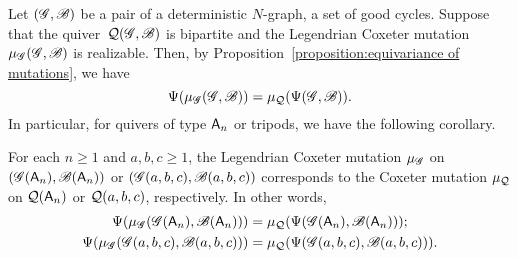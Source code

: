 Let $(\mathscr{G}, \mathscr{B})$ be a pair of a deterministic $N$-graph, a set of good cycles.
Suppose that the quiver~$\mathcal{Q}(\mathscr{G},\mathscr{B})$ is bipartite and the Legendrian Coxeter mutation $\mu_\mathscr{G}(\mathscr{G},\mathscr{B})$ is realizable.
Then, by Proposition~\ref{proposition:equivariance of mutations}, we have
\[
\Psi(\mu_\mathscr{G}(\mathscr{G},\mathscr{B})) = \mu_{\mathcal{Q}}(\Psi(\mathscr{G},\mathscr{B})).
\]
In particular, for quivers of type $\mathsf{A}_n$ or tripods, we have the following corollary.
\begin{corollary}\label{corollary:Coxeter mutations}
For each $n\ge 1$ and $a,b,c\ge 1$, the Legendrian Coxeter mutation $\mu_\mathscr{G}$ on $(\mathscr{G}(\mathsf{A}_n),\mathscr{B}(\mathsf{A}_n))$ or $(\mathscr{G}(a,b,c),\mathscr{B}(a,b,c))$ corresponds to the Coxeter mutation $\mu_{\mathcal{Q}}$ on $\mathcal{Q}(\mathsf{A}_n)$ or $\mathcal{Q}(a,b,c)$, respectively.
In other words,
\begin{align*}
\Psi(\mu_\mathscr{G}(\mathscr{G}(\mathsf{A}_n),\mathscr{B}(\mathsf{A}_n))) &= \mu_{\mathcal{Q}}(\Psi(\mathscr{G}(\mathsf{A}_n),\mathscr{B}(\mathsf{A}_n)));\\
\Psi(\mu_\mathscr{G}(\mathscr{G}(a,b,c),\mathscr{B}(a,b,c))) &= \mu_{\mathcal{Q}}(\Psi(\mathscr{G}(a,b,c),\mathscr{B}(a,b,c))).
\end{align*}
\end{corollary}


